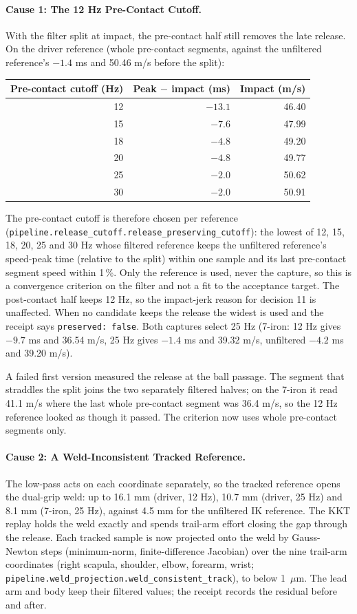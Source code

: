 \documentclass[11pt,a4paper]{article}
\begin{document}
\paragraph{Cause 1: The 12 Hz Pre-Contact Cutoff.} With the filter split at
impact, the pre-contact half still removes the late release. On the driver
reference (whole pre-contact segments, against the unfiltered reference's
$-1.4$ ms and 50.46 m/s before the split):
\begin{center}
\begin{tabular}{@{}rrr@{}}
\toprule
Pre-contact cutoff (Hz) & Peak $-$ impact (ms) & Impact (m/s) \\
\midrule
12 & $-13.1$ & 46.40 \\
15 & $-7.6$ & 47.99 \\
18 & $-4.8$ & 49.20 \\
20 & $-4.8$ & 49.77 \\
25 & $-2.0$ & 50.62 \\
30 & $-2.0$ & 50.91 \\
\bottomrule
\end{tabular}
\end{center}
The pre-contact cutoff is therefore chosen per reference
(\texttt{pipeline.release\_cutoff.release\_preserving\_cutoff}): the lowest of
12, 15, 18, 20, 25 and 30 Hz whose filtered reference keeps the unfiltered
reference's speed-peak time (relative to the split) within one sample and its
last pre-contact segment speed within 1\,\%. Only the reference is used,
never the capture, so this is a convergence criterion on the filter and not a
fit to the acceptance target. The post-contact half keeps 12 Hz, so the
impact-jerk reason for decision 11 is unaffected. When no candidate keeps the
release the widest is used and the receipt says \texttt{preserved: false}.
Both captures select 25 Hz (7-iron: 12 Hz gives $-9.7$ ms and 36.54 m/s,
25 Hz gives $-1.4$ ms and 39.32 m/s, unfiltered $-4.2$ ms and 39.20 m/s).

A failed first version measured the release at the ball passage. The segment
that straddles the split joins the two separately filtered halves; on the
7-iron it read 41.1 m/s where the last whole pre-contact segment was
36.4 m/s, so the 12 Hz reference looked as though it passed. The criterion
now uses whole pre-contact segments only.

\paragraph{Cause 2: A Weld-Inconsistent Tracked Reference.} The low-pass
acts on each coordinate separately, so the tracked reference opens the
dual-grip weld: up to 16.1 mm (driver, 12 Hz), 10.7 mm (driver, 25 Hz) and
8.1 mm (7-iron, 25 Hz), against 4.5 mm for the unfiltered IK reference. The
KKT replay holds the weld exactly and spends trail-arm effort closing the
gap through the release. Each tracked sample is now projected onto the weld
by Gauss-Newton steps (minimum-norm, finite-difference Jacobian) over the
nine trail-arm coordinates (right scapula, shoulder, elbow, forearm, wrist;
\texttt{pipeline.weld\_projection.weld\_consistent\_track}), to below
1~$\mu$m. The lead arm and body keep their filtered values; the receipt
records the residual before and after.
\end{document}
